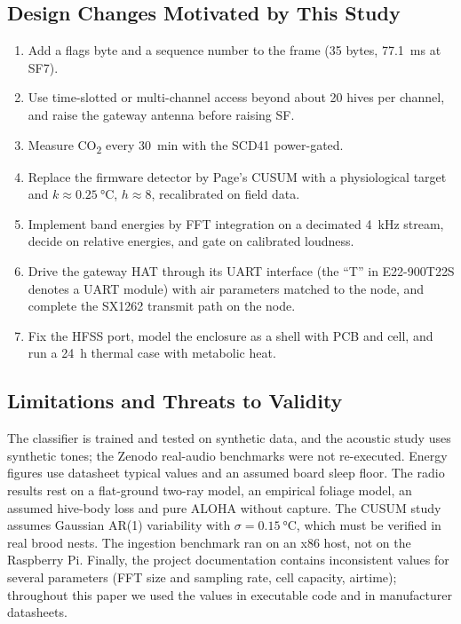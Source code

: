 \documentclass[conference]{IEEEtran}
\newcommand{\COtwo}{CO\textsubscript{2}}
\begin{document}
\subsection{Design Changes Motivated by This Study}
\begin{enumerate}
\item Add a flags byte and a sequence number to the frame (35 bytes, \SI{77.1}{ms} at SF7).
\item Use time-slotted or multi-channel access beyond about 20 hives per channel, and raise the gateway antenna before raising SF.
\item Measure \COtwo{} every \SI{30}{min} with the SCD41 power-gated.
\item Replace the firmware detector by Page's CUSUM with a physiological target and $k \approx \SI{0.25}{\celsius}$, $h \approx 8$, recalibrated on field data.
\item Implement band energies by FFT integration on a decimated \SI{4}{kHz} stream, decide on relative energies, and gate on calibrated loudness.
\item Drive the gateway HAT through its UART interface (the ``T'' in E22-900T22S denotes a UART module) with air parameters matched to the node, and complete the SX1262 transmit path on the node.
\item Fix the HFSS port, model the enclosure as a shell with PCB and cell, and run a \SI{24}{h} thermal case with metabolic heat.
\end{enumerate}

\subsection{Limitations and Threats to Validity}
The classifier is trained and tested on synthetic data, and the acoustic study uses synthetic tones; the Zenodo real-audio benchmarks were not re-executed. Energy figures use datasheet typical values and an assumed board sleep floor. The radio results rest on a flat-ground two-ray model, an empirical foliage model, an assumed hive-body loss and pure ALOHA without capture. The CUSUM study assumes Gaussian AR(1) variability with $\sigma = \SI{0.15}{\celsius}$, which must be verified in real brood nests. The ingestion benchmark ran on an x86 host, not on the Raspberry Pi. Finally, the project documentation contains inconsistent values for several parameters (FFT size and sampling rate, cell capacity, airtime); throughout this paper we used the values in executable code and in manufacturer datasheets.
\end{document}
